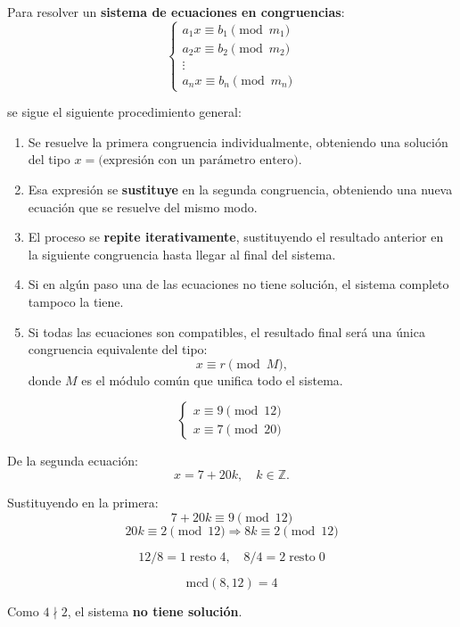 \documentclass[a4paper,12pt]{article}
\begin{document}
\begin{procedimiento}[title={Método general}]
Para resolver un \textbf{sistema de ecuaciones en congruencias}:
\[
\begin{cases}
a_1 x \equiv b_1 \pmod{m_1} \\
a_2 x \equiv b_2 \pmod{m_2} \\
\vdots \\
a_n x \equiv b_n \pmod{m_n}
\end{cases}
\]

se sigue el siguiente procedimiento general:

\begin{enumerate}
    \item Se resuelve la primera congruencia individualmente, obteniendo una solución del tipo \(x = \text{(expresión con un parámetro entero)}\).
    \item Esa expresión se \textbf{sustituye} en la segunda congruencia, obteniendo una nueva ecuación que se resuelve del mismo modo.
    \item El proceso se \textbf{repite iterativamente}, sustituyendo el resultado anterior en la siguiente congruencia hasta llegar al final del sistema.
    \item Si en algún paso una de las ecuaciones no tiene solución, el sistema completo tampoco la tiene.
    \item Si todas las ecuaciones son compatibles, el resultado final será una única congruencia equivalente del tipo:
    \[
    x \equiv r \pmod{M},
    \]
    donde \(M\) es el módulo común que unifica todo el sistema.
\end{enumerate}

\end{procedimiento}

\begin{ejemplo}[title={Ejemplo 2: Sistema sin solución}]
\[
\begin{cases}
x \equiv 9 \pmod{12} \\
x \equiv 7 \pmod{20}
\end{cases}
\]

De la segunda ecuación:
\[
x = 7 + 20k, \quad k \in \mathbb{Z}.
\]

Sustituyendo en la primera:
\[
7 + 20k \equiv 9 \pmod{12}
\]
\[
20k \equiv 2 \pmod{12} \Rightarrow 8k \equiv 2 \pmod{12}
\]

\[
12 / 8 = 1 \;\text{resto}\; \boxed{4}, \quad 8 / 4 = 2 \;\text{resto}\; 0
\]

\[
\text{mcd}(8,12) = \boxed{4}
\]

Como \(4 \nmid 2\), el sistema \textbf{no tiene solución}.
\end{ejemplo}
\end{document}

